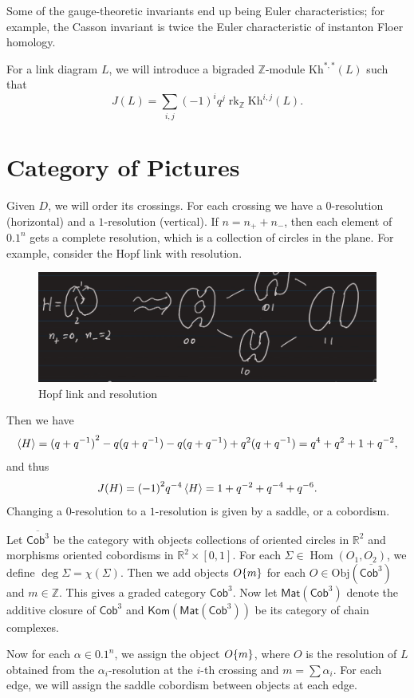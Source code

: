 \documentclass[leqno, openany]{memoir}
\theoremstyle{definition}
\theoremstyle{remark}
\theoremstyle{plain}
\theoremstyle{definition}
\theoremstyle{remark}
\newcommand{\R}{\mathbb{R}}
\newcommand{\Z}{\mathbb{Z}}
\newcommand{\mr}[1]{\mathrm{#1}}
\newcommand{\ms}[1]{\mathsf{#1}}
\newcommand{\ol}[1]{\overline{#1}}
\newcommand{\1}{\mathbf{1}}
\newcommand{\2}{\mathbf{2}}
\newcommand{\3}{\mathbf{3}}
\DeclareMathOperator{\Hom}{Hom}
\DeclareMathOperator{\rk}{rk}
\begin{document}
Some of the gauge-theoretic invariants end up being Euler characteristics; for example, the Casson invariant is twice the Euler characteristic of instanton Floer homology.

For a link diagram $L$, we will introduce a bigraded $\Z$-module $\mr{ Kh }^{*,*}(L)$ such that 
\[ J(L) = \sum_{i,j} {(-1)}^i q^j \rk_{\Z} \mr{ Kh }^{i,j}(L). \]

\section{Category of Pictures}%
\label{sec:category_of_pictures}

Given $D$, we will order its crossings. For each crossing we have a $0$-resolution (horizontal) and a $1$-resolution (vertical). If $n = n_+ + n_-$, then each element of $\qty{0,1}^n$ gets a complete resolution, which is a collection of circles in the plane. For example, consider the Hopf link with resolution. 

\begin{figure}[H]
    \centering
    \includegraphics[width=0.8\linewidth]{seb1.png}
    \caption{Hopf link and resolution}%
    \label{fig:seb1}
\end{figure}

Then we have
\[ \ev{H} = {(q+q^{-1})}^2 - q(q+q^{-1}) - q(q+q^{-1}) + q^2 (q+q^{-1}) = q^4 + q^2 + 1 + q^{-2}, \]
and thus 
\[ J(H) = {(-1)}^2 q^{-4} \ev{H} = 1 + q^{-2} + q^{-4} + q^{-6}. \]
Changing a $0$-resolution to a $1$-resolution is given by a saddle, or a cobordism.

Let $\ol{\ms{Cob}^3}$ be the category with objects collections of oriented circles in $\R^2$ and morphisms oriented cobordisms in $\R^2 \times [0,1]$. For each $\Sigma \in \Hom(O_1, O_2)$, we define $\deg \Sigma = \chi(\Sigma)$. Then we add objects $O\qty{m}$ for each $O \in \mr{Obj}(\ol{\ms{Cob}^3})$ and $m \in \Z$. This gives a graded category $\ms{Cob}^3$. Now let $\ms{Mat}(\ms{Cob}^3)$ denote the additive closure of $\ms{Cob}^3$ and $\ms{Kom}(\ms{Mat}(\ms{Cob}^3))$ be its category of chain complexes.

Now for each $\alpha \in \qty{0,1}^n$, we assign the object $O\qty{m}$, where $O$ is the resolution of $L$ obtained from the $\alpha_i$-resolution at the $i$-th crossing and $m = \sum \alpha_i$. For each edge, we will assign the saddle cobordism between objects at each edge.
\end{document}
